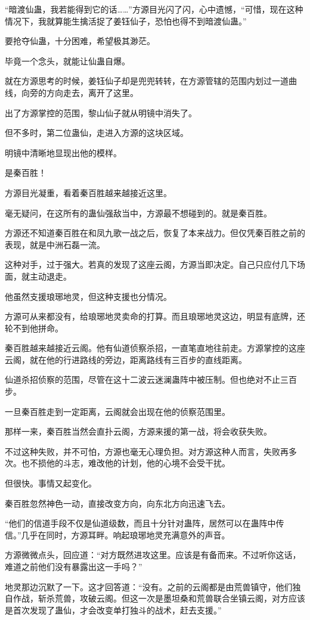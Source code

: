 \begin{this_body}
“暗渡仙蛊，我若能得到它的话……”方源目光闪了闪，心中遗憾，“可惜，现在这种情况下，我就算能生擒活捉了姜钰仙子，恐怕也得不到暗渡仙蛊。”

要抢夺仙蛊，十分困难，希望极其渺茫。

毕竟一个念头，就能让仙蛊自爆。

就在方源思考的时候，姜钰仙子却是兜兜转转，在方源管辖的范围内划过一道曲线，向旁的方向走去，离开了这里。

出了方源掌控的范围，黎山仙子就从明镜中消失了。

但不多时，第二位蛊仙，走进入方源的这块区域。

明镜中清晰地显现出他的模样。

是秦百胜！

方源目光凝重，看着秦百胜越来越接近这里。

毫无疑问，在这所有的蛊仙强敌当中，方源最不想碰到的。就是秦百胜。

方源还不知道秦百胜在和凤九歌一战之后，恢复了本来战力。但仅凭秦百胜之前的表现，就是中洲石磊一流。

这种对手，过于强大。若真的发现了这座云阁，方源当即决定。自己只应付几下场面，就主动退走。

他虽然支援琅琊地灵，但这种支援也分情况。

方源可从来都没有，给琅琊地灵卖命的打算。而且琅琊地灵这边，明显有底牌，还轮不到他拼命。

秦百胜越来越接近云阁。他有仙道侦察杀招，一直笔直地往前走。方源掌控的这座云阁，就在他的行进路线的旁边，距离路线有三百步的直线距离。

仙道杀招侦察的范围，尽管在这十二波云迷澜蛊阵中被压制。但也绝对不止三百步。

一旦秦百胜走到一定距离，云阁就会出现在他的侦察范围里。

那样一来，秦百胜当然会直扑云阁，方源来援的第一战，将会收获失败。

不过这种失败，并不可怕，方源也毫无心理负担。对方源这种人而言，失败再多次。也不损他的斗志，难改他的计划，他的心境不会受干扰。

但很快。事情又起变化。

秦百胜忽然神色一动，直接改变方向，向东北方向迅速飞去。

“他们的信道手段不仅是仙道级数，而且十分针对蛊阵，居然可以在蛊阵中传信。”几乎在同时，方源耳畔。响起琅琊地灵充满意外的声音。

方源微微点头，回应道：“对方既然进攻这里。应该是有备而来。不过听你这话，难道之前他们没有暴露出这一手吗？”

地灵那边沉默了一下。这才回答道：“没有。之前的云阁都是由荒兽镇守，他们独自作战，斩杀荒兽，攻破云阁。但这一次是墨坦桑和荒兽联合坐镇云阁，对方应该是首次发现了蛊仙，才会改变单打独斗的战术，赶去支援。”


\end{this_body}
